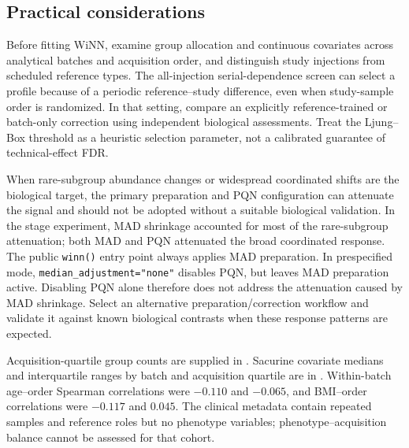 \documentclass[namedate,webpdf,modern,large,nocrop]{oup-authoring-template}
\begin{document}
\subsection{Practical considerations}

Before fitting WiNN, examine group allocation and continuous covariates across analytical batches and acquisition order, and distinguish study injections from scheduled reference types. The all-injection serial-dependence screen can select a profile because of a periodic reference--study difference, even when study-sample order is randomized. In that setting, compare an explicitly reference-trained or batch-only correction using independent biological assessments. Treat the Ljung--Box threshold as a heuristic selection parameter, not a calibrated guarantee of technical-effect FDR.

When rare-subgroup abundance changes or widespread coordinated shifts are the biological target, the primary preparation and PQN configuration can attenuate the signal and should not be adopted without a suitable biological validation. In the stage experiment, MAD shrinkage accounted for most of the rare-subgroup attenuation; both MAD and PQN attenuated the broad coordinated response. The public \texttt{winn()} entry point always applies MAD preparation. In prespecified mode, \texttt{median\_adjustment="none"} disables PQN, but leaves MAD preparation active. Disabling PQN alone therefore does not address the attenuation caused by MAD shrinkage. Select an alternative preparation/correction workflow and validate it against known biological contrasts when these response patterns are expected.

Acquisition-quartile group counts are supplied in . Sacurine covariate medians and interquartile ranges by batch and acquisition quartile are in . Within-batch age--order Spearman correlations were $-0.110$ and $-0.065$, and BMI--order correlations were $-0.117$ and $0.045$. The clinical metadata contain repeated samples and reference roles but no phenotype variables; phenotype--acquisition balance cannot be assessed for that cohort.

\begingroup
\renewcommand{\arraystretch}{0.90}

\endgroup
\begingroup

\endgroup
\begingroup

\endgroup
\end{document}
